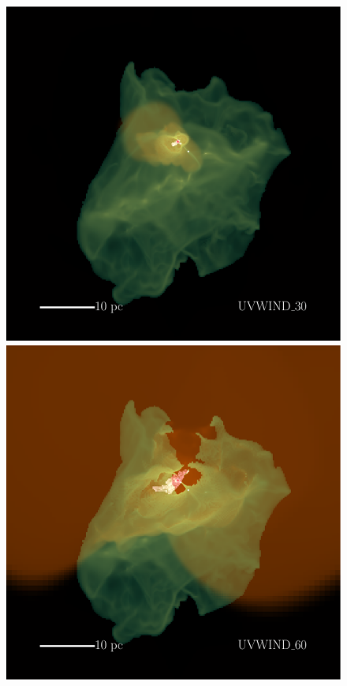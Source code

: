 \documentclass[a4paper,fleqn,usenatbib]{mnras}
\begin{document}
\begin{figure}
	\includegraphics[width=1\columnwidth]{../plots/vis/multiray/multirayTime_coolemission_ionemission_xrayemission2__windset_30Msun0p2Myr_zoom0p5__zwindonly.pdf} \includegraphics[width=1\columnwidth]{../plots/vis/multiray/multirayTime_coolemission_ionemission_xrayemission2__windset_60Msun0p2Myr_zoom0p5__zwindonly.pdf}

\end{figure}
\end{document}
